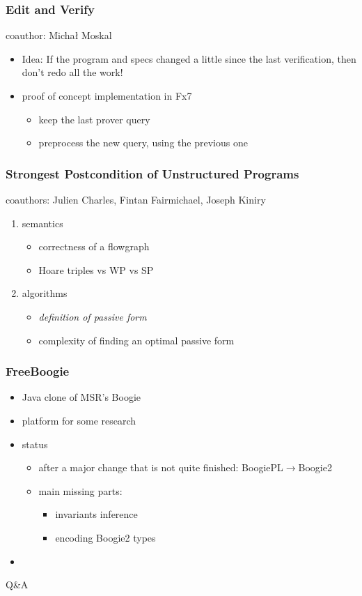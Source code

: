 \documentclass{beamer}
\begin{document}
\begin{frame}
  \frametitle{Edit and Verify}
  coauthor: Micha{\l} Moskal\bigskip
  \begin{itemize}
  \item Idea: If the program and specs changed a little since
    the last verification, then don't redo all the work!
  \item proof of concept implementation in Fx7
    \begin{itemize}
    \item keep the last prover query
    \item preprocess the new query, using the previous one
    \end{itemize}
  \end{itemize}
\end{frame}

\begin{frame}
  \frametitle{Strongest Postcondition of Unstructured Programs}
  coauthors: Julien Charles, Fintan Fairmichael, Joseph Kiniry
  \bigskip
  \begin{enumerate}
  \item semantics
    \begin{itemize}
    \item correctness of a flowgraph
    \item Hoare triples vs WP vs SP
    \end{itemize}
  \item algorithms
    \begin{itemize}
    \item \emph{definition of passive form}
    \item complexity of finding an optimal passive form
    \end{itemize}
  \end{enumerate}
\end{frame}

\begin{frame}
  \frametitle{FreeBoogie}
  \begin{itemize}
  \item Java clone of MSR's Boogie
  \item platform for some research
  \item status
    \begin{itemize}
    \item after a major change that is not quite finished:
      BoogiePL$\to$Boogie2
    \item main missing parts:
      \begin{itemize}
      \item invariants inference
      \item encoding Boogie2 types
      \end{itemize}
    \end{itemize}
  \item 
  \end{itemize}
\end{frame}
\begin{frame}
\centerline{\Huge Q\&A}
\end{frame}
\end{document}
